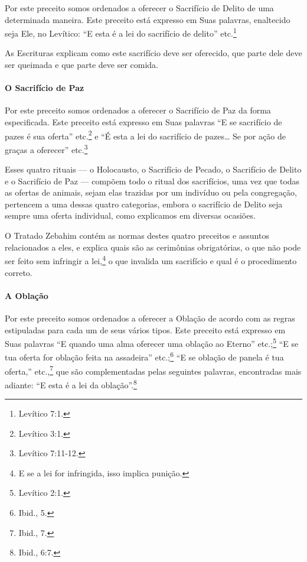 Por este preceito somos ordenados a oferecer o Sacrifício de Delito de
uma determinada maneira. Este preceito está expresso em Suas palavras,
enaltecido seja Ele, no Levítico: ``E esta é a lei do sacrifício de
delito'' etc.\footnote{Levítico 7:1.}

As Escrituras explicam como este sacrifício deve ser oferecido, que
parte dele deve ser queimada e que parte deve ser comida.

\paragraph{O Sacrifício de Paz}

Por este preceito somos ordenados a oferecer o Sacrifício de Paz da
forma especificada. Este preceito está expresso em Suas palavras ``E se
sacrifício de pazes é sua oferta'' etc.\footnote{Levítico 3:1.} e ``É esta a lei
do sacrifício de pazes\ldots{} Se por ação de graças a oferecer'' etc.\footnote{Levítico 7:11-12.}

Esses quatro rituais --- o Holocausto, o Sacrifício de Pecado, o
Sacrifício de Delito e o Sacrifício de Paz --- compõem todo o ritual
dos sacrifícios, uma vez que todas as ofertas de animais, sejam elas
trazidas por um indivíduo ou pela congregação, pertencem a uma dessas
quatro categorias, embora o sacrifício de Delito seja sempre uma oferta
individual, como explicamos em diversas ocasiões.

O Tratado Zebahim contém as normas destes quatro preceitos e assuntos
relacionados a eles, e explica quais são as cerimônias obrigatórias, o
que não pode ser feito sem infringir a lei,\footnote{E se a lei for infringida, isso implica punição.} o que
invalida um sacrifício e qual é o procedimento correto.

\paragraph{A Oblação}

Por este preceito somos ordenados a oferecer a Oblação de acordo com as
regras estipuladas para cada um de seus vários tipos. Este preceito está
expresso em Suas palavras ``E quando uma alma oferecer uma oblação ao
Eterno'' etc.;\footnote{Levítico 2:1.} ``E se tua oferta for oblação feita na
assadeira'' etc.;\footnote{Ibid., 5.} ``E se oblação de panela é tua oferta,''
etc.,\footnote{Ibid., 7.} que são complementadas pelas seguintes palavras,
encontradas mais adiante: ``E esta é a lei da oblação''.\footnote{Ibid., 6:7.}

